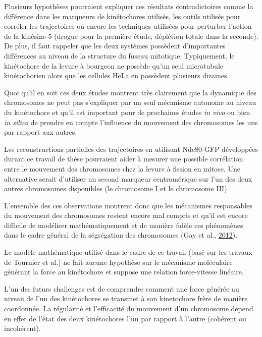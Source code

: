\documentclass[12pt,a4paper,twoside,openright]{book}
\begin{document}
Plusieurs hypothèses pourraient expliquer ces résultats contradictoires
comme la différence dans les marqueurs de kinétochores utilisés, les
outils utilisés pour corréler les trajectoires ou encore les techniques
utilisées pour perturber l'action de la kinésine-5 (drogue pour la
première étude, déplétion totale dans la seconde). De plus, il faut
rappeler que les deux systèmes possèdent d'importantes différences au
niveau de la structure du fuseau mitotique. Typiquement, le kinétochore
de la levure à bourgeon ne possède qu'un seul microtubule kinétochorien
alors que les cellules HeLa en possèdent plusieurs dizaines.

Quoi qu'il en soit ces deux études montrent très clairement que la
dynamique des chromosomes ne peut pas s'expliquer par un seul mécanisme
autonome au niveau du kinétochore et qu'il est important pour de
prochaines études \emph{in vivo} ou bien \emph{in silico} de prendre en
compte l'influence du mouvement des chromosomes les uns par rapport aux
autres.

Les reconstructions partielles des trajectoires en utilisant Ndc80-GFP
développées durant ce travail de thèse pourraient aider à mesurer une
possible corrélation entre le mouvement des chromosomes chez la levure à
fission en mitose. Une alternative serait d'utiliser un second marqueur
centromérique sur l'un des deux autres chromosomes disponibles (le
chromosome I et le chromosome III).

L'ensemble des ces observations montrent donc que les mécanismes
responsables du mouvement des chromosomes restent encore mal compris et
qu'il est encore difficile de modéliser mathématiquement et de manière
fidèle ces phénomènes dans le cadre général de la ségrégation des
chromosomes (Gay et al., \protect\hyperlink{ref-Gay2012a}{2012}).

Le modèle mathématique utilisé dans le cadre de ce travail (basé sur les
travaux de Tournier et al.) ne fait aucune hypothèse sur le mécanisme
moléculaire générant la force au kinétochore et suppose une relation
force-vitesse linéaire.

L'un des futurs challenges est de comprendre comment une force générée
au niveau de l'un des kinétochores se transmet à son kinetochore frère
de manière coordonnée. La régularité et l'efficacité du mouvement d'un
chromosome dépend en effet de l'état des deux kinétochores l'un par
rapport à l'autre (cohérent ou incohérent).
\end{document}
